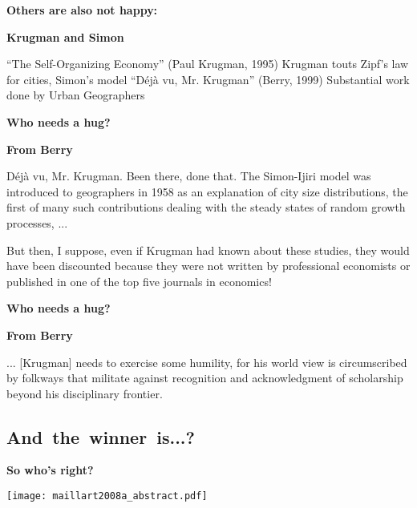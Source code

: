   \textbf{Others are also not happy:}

  \textbf{Krugman and Simon}
    
     ``The Self-Organizing Economy'' (Paul Krugman, 1995)\cite{krugman1995a}
     Krugman touts Zipf's law for cities, Simon's model
     ``D\'{e}j\`{a} vu, Mr. Krugman'' (Berry, 1999)
     Substantial work done by Urban Geographers 
    
  


  \textbf{Who needs a hug?}

  \textbf{From Berry\cite{berry1999a}}
    
    
      D\'{e}j\`{a} vu, Mr. Krugman. Been there, done that. The Simon-Ijiri model was introduced 
      to geographers in 1958 as an explanation of city size distributions, the first of many such 
      contributions dealing with the steady states of random growth processes, ...
    
      But then, I suppose, even if Krugman 
      had known about these studies, they would have been discounted because they were not 
      written by professional economists or published in one of the top five journals in economics!  
    
    


  \textbf{Who needs a hug?}

  \textbf{From Berry\cite{berry1999a}}
    
     ... [Krugman] needs to exercise some humility, for his 
    world view is circumscribed by folkways that militate against recognition and 
    acknowledgment of scholarship beyond his disciplinary frontier. 
    

  
  

\subsection{And\ the\ winner\ is...?}

  \textbf{So who's right?}

  
    \texttt{[image: maillart2008a\_abstract.pdf]}
  


